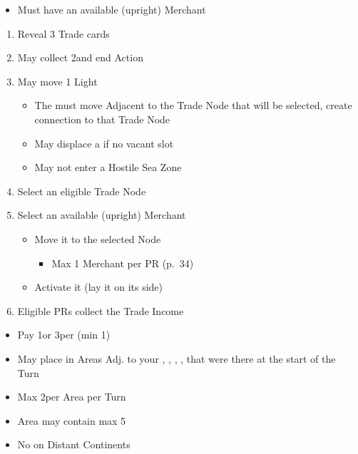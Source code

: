 \documentclass[10pt]{article}
\begin{document}
\begin{itemize}
	\item Must have an available (upright) Merchant
\end{itemize}
\begin{enumerate}
	\item Reveal 3 Trade cards
	\item May collect 2\ducats and end Action
	\item May move 1 Light \ship
	\begin{itemize}
		\item The \ship must move Adjacent to the Trade Node that will be selected,  create connection to that Trade Node
		\item May displace a \ship if no vacant slot
		\item May not enter a Hostile Sea Zone
	\end{itemize}
	\item Select an eligible Trade Node
	\item Select an available (upright) Merchant
	\begin{itemize}
		\item Move it to the selected Node
		\begin{itemize}
			\item Max 1 Merchant per PR (p.~34)
		\end{itemize}
		\item Activate it (lay it on its side)
	\end{itemize}
	\item Eligible PRs collect the Trade Income
\end{enumerate}

\begin{itemize}
	\item Pay 1\diplopower or 3\ducats per \influence (min 1\diplopower)
	\item May place \influence in Areas Adj. to your \towns, \vassals, \alliances, \marriages, \influence that were there at the start of the Turn
	\item Max 2\influence per Area per Turn
	\item Area may contain max 5\influence
	\item No \influence on Distant Continents
\end{itemize}
\end{document}
